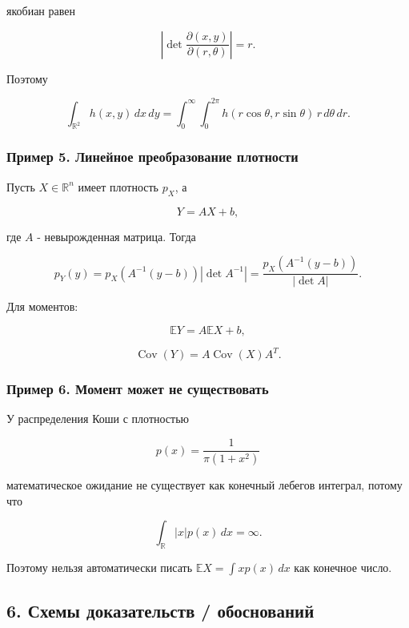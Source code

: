 \documentclass[
  11pt,
  a4paper,
]{article}
\begin{document}
якобиан равен

\[
\left|\det\frac{\partial(x,y)}{\partial(r,\theta)}\right|=r.
\]

Поэтому

\[
\int_{\mathbb R^2}h(x,y)\,dx\,dy
=
\int_0^\infty\int_0^{2\pi}
h(r\cos\theta,r\sin\theta)\,r\,d\theta\,dr.
\]

\subsubsection{Пример 5. Линейное преобразование
плотности}\label{ux43fux440ux438ux43cux435ux440-5.-ux43bux438ux43dux435ux439ux43dux43eux435-ux43fux440ux435ux43eux431ux440ux430ux437ux43eux432ux430ux43dux438ux435-ux43fux43bux43eux442ux43dux43eux441ux442ux438}

Пусть \(X\in\mathbb R^n\) имеет плотность \(p_X\), а

\[
Y=AX+b,
\]

где \(A\) - невырожденная матрица. Тогда

\[
p_Y(y)
=
p_X(A^{-1}(y-b))|\det A^{-1}|
=
\frac{p_X(A^{-1}(y-b))}{|\det A|}.
\]

Для моментов:

\[
\mathbb EY=A\mathbb EX+b,
\]

\[
\operatorname{Cov}(Y)=A\operatorname{Cov}(X)A^T.
\]

\subsubsection{Пример 6. Момент может не
существовать}\label{ux43fux440ux438ux43cux435ux440-6.-ux43cux43eux43cux435ux43dux442-ux43cux43eux436ux435ux442-ux43dux435-ux441ux443ux449ux435ux441ux442ux432ux43eux432ux430ux442ux44c}

У распределения Коши с плотностью

\[
p(x)=\frac1{\pi(1+x^2)}
\]

математическое ожидание не существует как конечный лебегов интеграл,
потому что

\[
\int_{\mathbb R} |x|p(x)\,dx=\infty.
\]

Поэтому нельзя автоматически писать \(\mathbb EX=\int xp(x)\,dx\) как
конечное число.

\subsection{6. Схемы доказательств /
обоснований}\label{ux441ux445ux435ux43cux44b-ux434ux43eux43aux430ux437ux430ux442ux435ux43bux44cux441ux442ux432-ux43eux431ux43eux441ux43dux43eux432ux430ux43dux438ux439}
\end{document}
